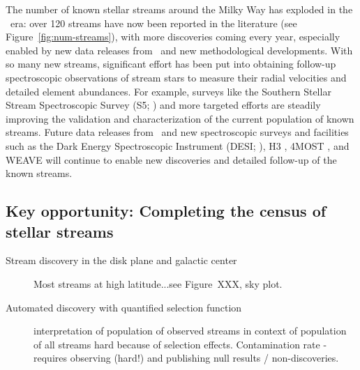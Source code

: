\documentclass[final,5p,times,twocolumn,authoryear]{elsarticle}
\begin{document}
The number of known stellar streams around the Milky Way has exploded in the \gaia\ era:
over 120 streams have now been reported in the literature (see
Figure~\ref{fig:num-streams}), with more discoveries coming every year, especially
enabled by new data releases from \gaia\ and new methodological developments.
With so many new streams, significant effort has been put into obtaining follow-up
spectroscopic observations of stream stars to measure their radial velocities and
detailed element abundances.
For example, surveys like the Southern Stellar Stream Spectroscopic Survey (S5;
\citep{li:2019,li:2022}) and more targeted efforts \citep[e.g.,][]{ibata:2021} are
steadily improving the validation and characterization of the current population of
known streams.
Future data releases from \gaia\ and new spectroscopic surveys and facilities such as
the Dark Energy Spectroscopic Instrument (DESI; \citealt{desi:2016}), H3
\citep{conroy:2019}, 4MOST \citep{4most:2012}, and WEAVE \citep{weave:2012} will
continue to enable new discoveries and detailed follow-up of the known streams.



\subsection{Key opportunity: Completing the census of stellar streams}
\begin{description}
    \item[Stream discovery in the disk plane and galactic center] Most streams at high latitude...see Figure~XXX, sky plot.
    \item[Automated discovery with quantified selection function] interpretation of population of observed streams in context of population of all streams hard because of selection effects. Contamination rate - requires observing (hard!) and publishing null results / non-discoveries.
\end{description}


\end{document}
